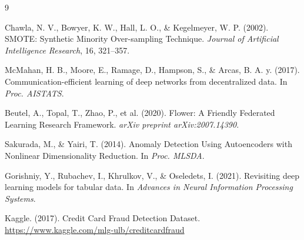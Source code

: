\documentclass[10pt]{article}
\begin{document}
\begin{thebibliography}{9}

Chawla, N. V., Bowyer, K. W., Hall, L. O., \& Kegelmeyer, W. P. (2002). SMOTE: Synthetic Minority Over-sampling Technique. \emph{Journal of Artificial Intelligence Research}, 16, 321–357.

McMahan, H. B., Moore, E., Ramage, D., Hampson, S., \& Arcas, B. A. y. (2017). Communication-efficient learning of deep networks from decentralized data. In \emph{Proc. AISTATS}.

Beutel, A., Topal, T., Zhao, P., et al. (2020). Flower: A Friendly Federated Learning Research Framework. \emph{arXiv preprint arXiv:2007.14390}.

Sakurada, M., \& Yairi, T. (2014). Anomaly Detection Using Autoencoders with Nonlinear Dimensionality Reduction. In \emph{Proc. MLSDA}.

Gorishniy, Y., Rubachev, I., Khrulkov, V., \& Oseledets, I. (2021). Revisiting deep learning models for tabular data. In \emph{Advances in Neural Information Processing Systems}.

Kaggle. (2017). Credit Card Fraud Detection Dataset. \url{https://www.kaggle.com/mlg-ulb/creditcardfraud}

\end{thebibliography}
\end{document}
